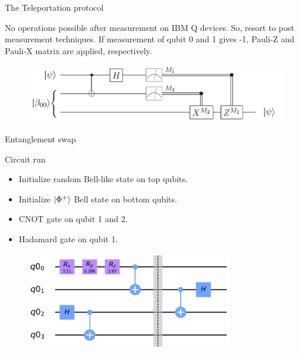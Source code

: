 \begin{frame}{The Teleportation protocol}

No operations possible after measurement on IBM Q devices. So, resort to post
measurement techniques. If measurement of qubit 0 and 1 gives -1, Pauli-Z and
Pauli-X matrix are applied, respectively.
\vspace{0.5cm}
\begin{figure}[h] \centering
  \includegraphics[width=\textwidth]{images/Teleport_general.png}
  \label{fig:tele_gen}
\end{figure}
	
\end{frame}

\begin{frame}{Entanglement swap}
	
\begin{block}{Circuit run}
  \begin{itemize}
    \item Initialize random Bell-like state on top qubits.
    \item Initialize $\ket{\Phi^+}$ Bell state on bottom qubits.
    \item CNOT gate on qubit 1 and 2.
    \item Hadamard gate on qubit 1.
  \end{itemize}
\end{block}

\begin{figure}[h] \centering
  \includegraphics[width=0.8\textwidth]{images/swap_circuit.png}
  \label{fig:swap_circ}
\end{figure}
	
\end{frame}

